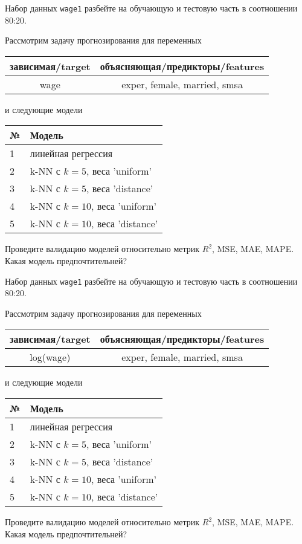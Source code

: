 \begin{exercise}
Набор данных \texttt{wage1} разбейте на обучающую и тестовую часть
в соотношении 80:20.

Рассмотрим задачу прогнозирования для переменных
\begin{center}
	\begin{tabular}{|c|c|}\hline
		зависимая/target & объясняющая/предикторы/features \\ \hline
		wage & exper, female, married, smsa \\ \hline
	\end{tabular}
\end{center}
и следующие модели
\begin{center}
	\begin{tabular}{|l|l|}\hline
		№ & Модель \\ \hline
		1 & линейная регрессия\\
		2 & k-NN с \(k=5\), веса 'uniform' \\
		3 & k-NN с \(k=5\), веса 'distance' \\
		4 & k-NN с \(k=10\), веса 'uniform' \\
		5 & k-NN с \(k=10\), веса 'distance' \\ \hline
	\end{tabular}
\end{center}
Проведите валидацию моделей относительно метрик \(R^2\), MSE, MAE,
MAPE. Какая модель предпочтительней?
\end{exercise}

\begin{exercise}
Набор данных \texttt{wage1} разбейте на обучающую и тестовую часть
в соотношении 80:20.

Рассмотрим задачу прогнозирования для переменных
\begin{center}
	\begin{tabular}{|c|c|}\hline
		зависимая/target & объясняющая/предикторы/features \\ \hline
		log(wage) & exper, female, married, smsa \\ \hline
	\end{tabular}
\end{center}
и следующие модели
\begin{center}
	\begin{tabular}{|l|l|}\hline
		№ & Модель \\ \hline
		1 & линейная регрессия\\
		2 & k-NN с \(k=5\), веса 'uniform' \\
		3 & k-NN с \(k=5\), веса 'distance' \\
		4 & k-NN с \(k=10\), веса 'uniform' \\
		5 & k-NN с \(k=10\), веса 'distance' \\ \hline
	\end{tabular}
\end{center}
Проведите валидацию моделей относительно метрик \(R^2\), MSE, MAE,
MAPE. Какая модель предпочтительней?
\end{exercise}

